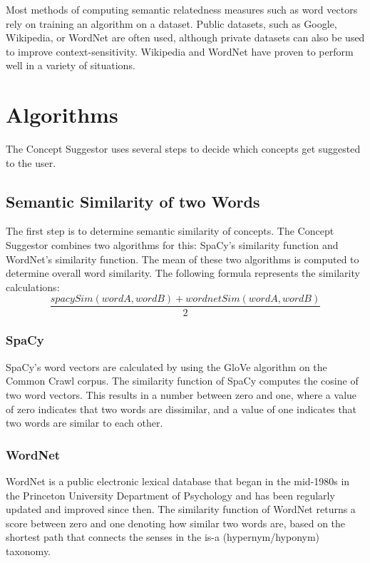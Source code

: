 \documentclass{article}
\begin{document}
Most methods of computing semantic relatedness measures such as word vectors rely on training an algorithm on a dataset. Public datasets, such as Google, Wikipedia, or WordNet are often used, although private datasets can also be used to improve context-sensitivity. Wikipedia and WordNet have proven to perform well in a variety of situations.\cite{strube2006wikirelate}

\section{Algorithms}

The Concept Suggestor uses several steps to decide which concepts get suggested to the user.

\subsection{Semantic Similarity of two Words}

The first step is to determine semantic similarity of concepts. The Concept Suggestor combines two algorithms for this: SpaCy's similarity function and WordNet's similarity function. The mean of these two algorithms is computed to determine overall word similarity. The following formula represents the similarity calculations:
\begin{equation} \label{eq:totalsimilarity}
	\frac{spacySim(wordA, wordB) + wordnetSim(wordA, wordB)} {2}
\end{equation}

\subsubsection{SpaCy}
SpaCy's word vectors are calculated by using the GloVe algorithm on the Common Crawl corpus. The similarity function of SpaCy computes the cosine of two word vectors. This results in a number between zero and one, where a value of zero indicates that two words are dissimilar, and a value of one indicates that two words are similar to each other.

\subsubsection{WordNet}
WordNet is a public electronic lexical database that began in the mid-1980s in the Princeton University Department of Psychology and has been regularly updated and improved since then. The similarity function of WordNet returns a score between zero and one denoting how similar two words are, based on the shortest path that connects the senses in the is-a (hypernym/hyponym) taxonomy. %
\end{document}
